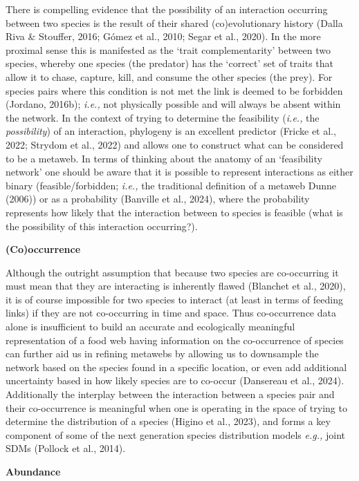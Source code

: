 \documentclass[
]{article}
\begin{document}
There is compelling evidence that the possibility of an interaction
occurring between two species is the result of their shared
(co)evolutionary history (Dalla Riva \& Stouffer, 2016; Gómez et al.,
2010; Segar et al., 2020). In the more proximal sense this is manifested
as the `trait complementarity' between two species, whereby one species
(the predator) has the `correct' set of traits that allow it to chase,
capture, kill, and consume the other species (the prey). For species
pairs where this condition is not met the link is deemed to be forbidden
(Jordano, 2016b); \emph{i.e.,} not physically possible and will always
be absent within the network. In the context of trying to determine the
feasibility (\emph{i.e.,} the \emph{possibility}) of an interaction,
phylogeny is an excellent predictor (Fricke et al., 2022; Strydom et
al., 2022) and allows one to construct what can be considered to be a
metaweb. In terms of thinking about the anatomy of an `feasibility
network' one should be aware that it is possible to represent
interactions as either binary (feasible/forbidden; \emph{i.e.,} the
traditional definition of a metaweb Dunne (2006)) or as a probability
(Banville et al., 2024), where the probability represents how likely
that the interaction between to species is feasible (what is the
possibility of this interaction occurring?).

\textbf{(Co)occurrence}

Although the outright assumption that because two species are
co-occurring it must mean that they are interacting is inherently flawed
(Blanchet et al., 2020), it is of course impossible for two species to
interact (at least in terms of feeding links) if they are not
co-occurring in time and space. Thus co-occurrence data alone is
insufficient to build an accurate and ecologically meaningful
representation of a food web having information on the co-occurrence of
species can further aid us in refining metawebs by allowing us to
downsample the network based on the species found in a specific
location, or even add additional uncertainty based in how likely species
are to co-occur (Dansereau et al., 2024). Additionally the interplay
between the interaction between a species pair and their co-occurrence
is meaningful when one is operating in the space of trying to determine
the distribution of a species (Higino et al., 2023), and forms a key
component of some of the next generation species distribution models
\emph{e.g.,} joint SDMs (Pollock et al., 2014).

\textbf{Abundance}
\end{document}
